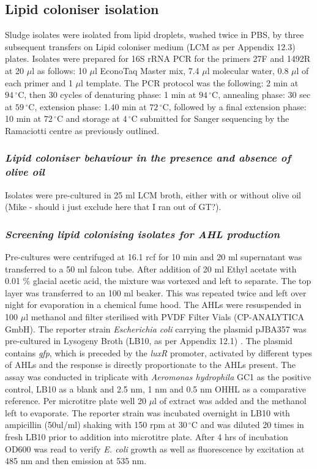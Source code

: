 \documentclass{article}
\begin{document}
\subsection{Lipid coloniser isolation}
Sludge isolates  were isolated from lipid droplets, washed twice in PBS, by three subsequent transfers on Lipid coloniser medium (LCM as per Appendix 12.3) plates. Isolates were prepared for 16S rRNA PCR for the primers 27F and 1492R at 20 $\mu$l as follows: 10 $\mu$l EconoTaq Master mix, 7.4 $\mu$l molecular water, 0.8 $\mu$l of each primer and 1 $\mu$l template. The PCR protocol was the following: 2 min at $94\,^{\circ}\mathrm{C}$, then 30 cycles of denaturing phase: 1 min at $94\,^{\circ}\mathrm{C}$, annealing phase: 30 sec at  $59\,^{\circ}\mathrm{C}$, extension phase: 1.40 min at $72\,^{\circ}\mathrm{C}$, followed by a final extension phase: 10 min at $72\,^{\circ}\mathrm{C}$ and storage at $4\,^{\circ}\mathrm{C}$ submitted for Sanger sequencing by the Ramaciotti centre as previously outlined.

\subsubsection{\emph{Lipid coloniser behaviour in the presence and absence of olive oil}}
Isolates were pre-cultured in 25 ml LCM broth, either with or without olive oil (Mike - should i just exclude here that I ran out of GT?). 

\subsubsection{\emph{Screening lipid colonising isolates for AHL production}}
Pre-cultures were centrifuged at 16.1 rcf for 10 min and 20 ml supernatant was transferred to a 50 ml falcon tube. After addition of 20 ml Ethyl acetate with 0.01 \% glacial acetic acid, the mixture was vortexed and left to separate. The top  layer was transferred to an 100 ml beaker. This was repeated twice and left over night for evaporation in a chemical fume hood. The AHLs were resuspended in 100  $\mu$l methanol and filter sterilised with PVDF Filter Vials (CP-ANALYTICA GmbH). 
 The reporter strain \emph{Escherichia coli} carrying the plasmid pJBA357 was pre-cultured in Lysogeny Broth (LB10, as per Appendix 12.1) \cite{bertani1951studies}. The plasmid contains \emph{gfp}, which  is preceded by the \emph{luxR} promoter, activated by different types of AHLs and the response is directly proportionate to the AHLs present.
The assay was conducted in triplicate with \emph{Aeromonas hydrophila} GC1 as the positive control, LB10 as a blank and 2.5 nm, 1 nm and 0.5 nm OHHL as a comparative reference. Per microtitre plate well 20 $\mu$l of extract was added and the methanol left to evaporate. The reporter strain was incubated overnight in LB10 with ampicillin (50ul/ml) shaking with 150 rpm at $30\,^{\circ}\mathrm{C}$ and was diluted 20 times in fresh LB10 prior to addition into microtitre plate.  After 4 hrs of incubation OD600 was read to verify \emph{E. coli} growth as well as fluorescence by excitation at 485 nm and then emission at 535 nm.
\end{document}
